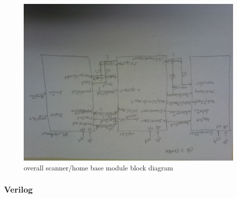 \documentclass{article}
\begin{document}
      \begin{figure}[H]
        \centering
        \includegraphics[width=0.75\linewidth]{figures/block_diagrams/overall_blockdiagram.jpg}
        \caption{overall scanner/home base module block diagram}
        \label{fig:lab5_overall_blockdiagram}
      \end{figure}

    \subsubsection{Verilog}
      
      

      
      

      
      

      
      

      
      

      
      
\end{document}
